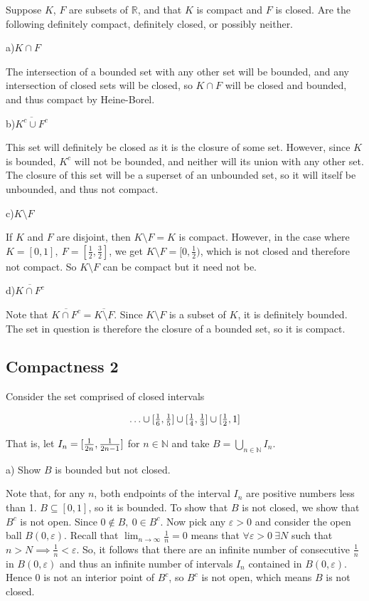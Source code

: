 \documentclass[11pt]{article}
\newcommand{\N}{\mathbb{N}}
\newcommand{\R}{\mathbb{R}}
\begin{document}
Suppose $K$, $F$ are subsets of $\R$, and that $K$ is compact and $F$ is closed. Are the following definitely compact, definitely closed, or possibly neither.

a)\quad $K\cap F$

The intersection of a bounded set with any other set will be bounded,
and any intersection of closed sets will be closed, so
$K\cap F$ will be closed and bounded, and thus compact by Heine-Borel.

b)\quad $\overline{K^c \cup F^c}$   

This set will definitely be closed as it is the closure of some set.
However, since $K$ is bounded, $K^c$ will not be bounded, and neither will
its union with any other set. The closure of this set will be a superset
of an unbounded set, so it will itself be unbounded, and thus not compact.

c)\quad $K\setminus F$

If $K$ and $F$ are disjoint, then $K\setminus F = K$ is 
compact.
However, in the case where $K=[0,1],\ F=[\frac{1}{2},\frac{3}{2}]$,
we get $K\setminus F = [0,\frac{1}{2})$, which is not closed and 
therefore not compact. So $K\setminus F$ can be compact but it need not be.

d)\quad $\overline{K \cap F^c}$

Note that $\overline{K\cap F^c}=\overline{K\setminus F}$.
Since $K\setminus F$ is a subset of $K$, it is definitely bounded.
The set in question is therefore the closure of a bounded set,
so it is compact.


\subsection*{Compactness 2}

Consider the set comprised of closed intervals

$$\textstyle  \ldots  \cup [{1\over 6}, {1\over 5}] \cup [{1\over 4},{1\over 3}] \cup  [{1\over 2},1] $$

That is, let $I_n= [{1\over 2n},{1\over 2n-1}]$ for $n\in \N$ and take $B=\bigcup_{n\in\N} I_n $. 

a) Show $B$ is bounded but not closed. 

Note that, for any $n$, both endpoints of the interval $I_n$ are positive
numbers less than 1. $B\subseteq [0,1]$, so it is bounded. To show that
$B$ is not closed, we show that $B^c$ is not open.
Since $0\notin B,\ 0\in B^c$. Now pick any $\varepsilon>0$ and consider
the open ball $B(0,\varepsilon)$. Recall that $\lim_{n\to\infty}\frac{1}{n}=0$
means that $\forall \varepsilon>0\ \exists N$ such that
$n>N\implies\frac{1}{n}<\varepsilon$. So, it follows that there are an
infinite number of consecutive $\frac{1}{n}$ in $B(0,\varepsilon)$
and thus an infinite number of intervals $I_n$ contained in $B(0,\varepsilon)$.
Hence 0 is not an interior point of $B^c$, so $B^c$ is not open, which means
$B$ is not closed.
\end{document}
